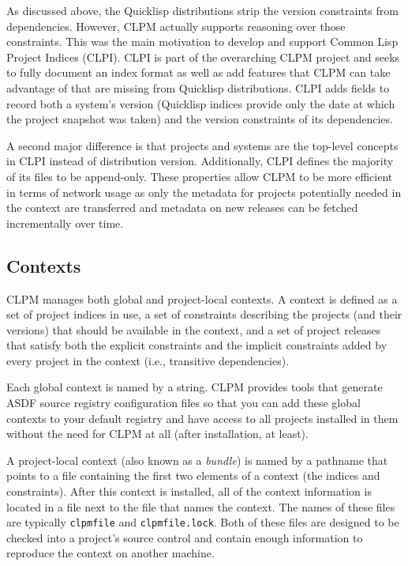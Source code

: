 \documentclass[format=sigconf]{acmart}
\begin{document}
As discussed above, the Quicklisp distributions strip the version constraints
from dependencies. However, CLPM actually supports reasoning over those
constraints. This was the main motivation to develop and support Common Lisp
Project Indices (CLPI). CLPI is part of the overarching CLPM project and seeks
to fully document an index format as well as add features that CLPM can take
advantage of that are missing from Quicklisp distributions. CLPI adds fields to
record both a system's version (Quicklisp indices provide only the date at
which the project snapshot was taken) and the version constraints of its
dependencies.

A second major difference is that projects and systems are the top-level
concepts in CLPI instead of distribution version. Additionally, CLPI defines
the majority of its files to be append-only. These properties allow CLPM to be
more efficient in terms of network usage as only the metadata for projects
potentially needed in the context are transferred and metadata on new releases
can be fetched incrementally over time.

\subsection{Contexts}

CLPM manages both global and project-local contexts. A context is defined as a
set of project indices in use, a set of constraints describing the projects
(and their versions) that should be available in the context, and a set of
project releases that satisfy both the explicit constraints and the implicit
constraints added by every project in the context (i.e., transitive
dependencies).

Each global context is named by a string. CLPM provides tools that generate
ASDF source registry configuration files so that you can add these global
contexts to your default registry and have access to all projects installed in
them without the need for CLPM at all (after installation, at least).

A project-local context (also known as a {\it bundle}) is named by a pathname
that points to a file containing the first two elements of a context (the
indices and constraints). After this context is installed, all of the context
information is located in a file next to the file that names the context. The
names of these files are typically {\tt clpmfile} and {\tt clpmfile.lock}. Both
of these files are designed to be checked into a project's source control and
contain enough information to reproduce the context on another machine.
\end{document}
